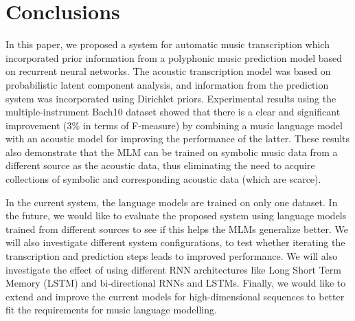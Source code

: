 \section{Conclusions} \label{sec:conclusions}

In this paper, we proposed a system for automatic music transcription which incorporated prior information from a polyphonic music prediction model based on recurrent neural networks. The acoustic transcription model was based on probabilistic latent component analysis, and information from the prediction system was incorporated using Dirichlet priors. Experimental results using the multiple-instrument Bach10 dataset showed that there is a clear and significant improvement (3\% in terms of F-measure) by combining a music language model with an acoustic model for improving the performance of the latter. These results also demonstrate that the MLM can be trained on symbolic music data from a different source as the acoustic data, thus eliminating the need to acquire collections of symbolic and corresponding acoustic data (which are scarce).

In the current system, the language models are trained  on only one dataset. In the future, we would like to evaluate the proposed system using language models trained from different sources to see if this helps the MLMs generalize better. We will also investigate different system configurations, to test whether iterating the transcription and prediction steps leads to improved performance. We will also investigate the effect of using different RNN architectures like Long Short Term Memory (LSTM) and bi-directional RNNs and LSTMs. Finally, we would like to extend and improve the current models for high-dimensional sequences to better fit the requirements for music language modelling. 